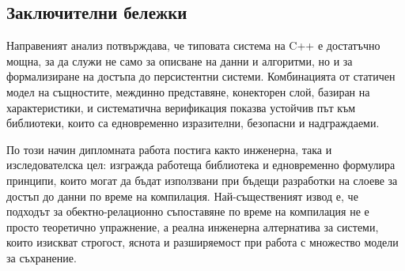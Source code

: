 \subsection{Заключителни бележки}

Направеният анализ потвърждава, че типовата система на C++ е достатъчно мощна, за да служи не само за описване на данни и алгоритми, но и за формализиране на достъпа до персистентни системи. Комбинацията от статичен модел на същностите, междинно представяне, конекторен слой, базиран на характеристики, и систематична верификация показва устойчив път към библиотеки, които са едновременно изразителни, безопасни и надграждаеми.

По този начин дипломната работа постига както инженерна, така и изследователска цел: изгражда работеща библиотека и едновременно формулира принципи, които могат да бъдат използвани при бъдещи разработки на слоеве за достъп до данни по време на компилация. Най-същественият извод е, че подходът за обектно-релационно съпоставяне по време на компилация не е просто теоретично упражнение, а реална инженерна алтернатива за системи, които изискват строгост, яснота и разширяемост при работа с множество модели за съхранение.
